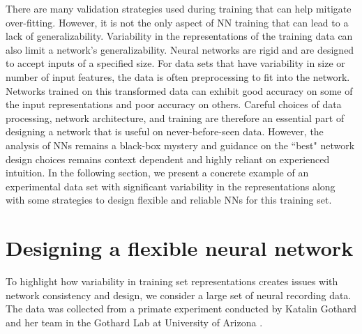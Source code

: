 \documentclass[12pt]{article}
\begin{document}
\indent There are many validation strategies used during training that can help mitigate over-fitting. However, it is not the only aspect of NN training that can lead to a lack of generalizability. Variability in the representations of the training data can also limit a network's generalizability. Neural networks are rigid and are designed to accept inputs of a specified size. For data sets that have variability in size or number of input features, the data is often preprocessing to fit into the network. Networks trained on this transformed data can exhibit good accuracy on some of the input representations and poor accuracy on others. Careful choices of data processing, network architecture, and training are therefore an essential part of designing a network that is useful on never-before-seen data. However, the analysis of NNs remains a black-box mystery and guidance on the ``best" network design choices remains context dependent and highly reliant on experienced intuition. In the following section, we present a concrete example of an experimental data set with significant variability in the representations along with some strategies to design flexible and reliable NNs for this training set.
\section{Designing a flexible neural network}
To highlight how variability in training set representations creates issues with network consistency and design, we consider a large set of neural recording data. The data was collected from a primate experiment conducted by Katalin Gothard and her team in the Gothard Lab at University of Arizona \cite{lab}.
\end{document}
